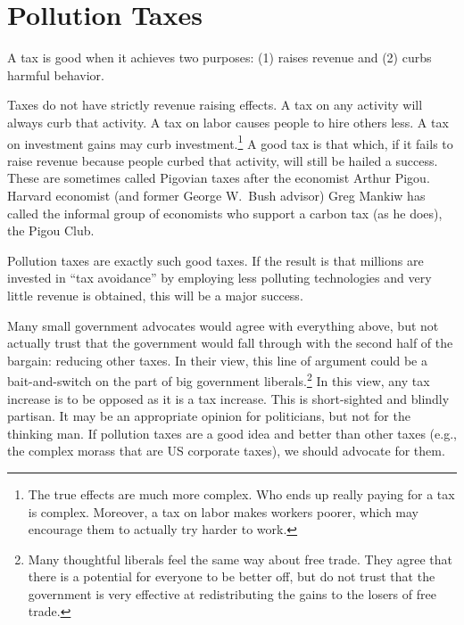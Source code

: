 
\section{Pollution Taxes}

A tax is good when it achieves two purposes: (1) raises revenue and (2) curbs
harmful behavior.

Taxes do not have strictly revenue raising effects. A tax on any activity will
always curb that activity. A tax on labor causes people to hire others
less. A tax on investment gains may curb investment.\footnote{The true effects
are much more complex. Who ends up really paying for a tax is complex.
Moreover, a tax on labor makes workers poorer, which may encourage them to
actually try harder to work.} A good tax is that which, if it fails to raise
revenue because people curbed that activity, will still be hailed a success.
These are sometimes called Pigovian taxes after the economist Arthur Pigou.
Harvard economist (and former George W.\ Bush advisor) Greg Mankiw has called
the informal group of economists who support a carbon tax (as he does), the
Pigou Club.

Pollution taxes are exactly such good taxes. If the result is that millions are
invested in ``tax avoidance'' by employing less polluting technologies and very
little revenue is obtained, this will be a major success.

Many small government advocates would agree with everything above, but not
actually trust that the government would fall through with the second half of
the bargain: reducing other taxes. In their view, this line of argument could
be a bait-and-switch on the part of big government liberals.\footnote{Many
thoughtful liberals feel the same way about free trade. They agree that there
is a potential for everyone to be better off, but do not trust that the
government is very effective at redistributing the gains to the losers of free
trade.} In this view, any tax increase is to be opposed as it is a tax
increase. This is short-sighted and blindly partisan. It may be an appropriate
opinion for politicians, but not for the thinking man. If pollution taxes are a
good idea and better than other taxes (e.g., the complex morass that are US
corporate taxes), we should advocate for them.

